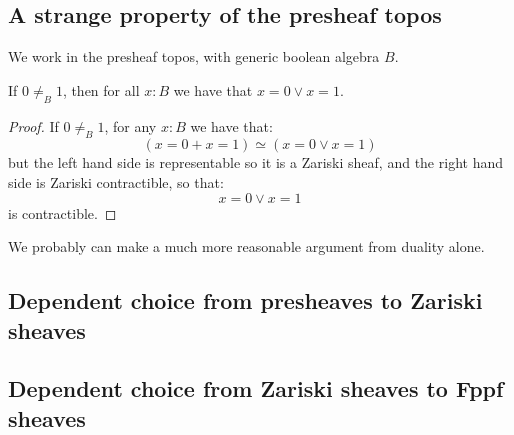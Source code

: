 \subsection{A strange property of the presheaf topos}

We work in the presheaf topos, with generic boolean algebra $B$.

\begin{lemma}
If $0\not=_B1$, then for all $x:B$ we have that $x=0\lor x=1$.
\end{lemma}

\begin{proof}
If $0\not=_B1$, for any $x:B$ we have that:
\[(x=0+x=1) \simeq (x=0\lor x=1)\]
but the left hand side is representable so it is a Zariski sheaf, and the right hand side is Zariski contractible, so that:
\[x=0\lor x=1\]
is contractible.
\end{proof}

\begin{remark}
We probably can make a much more reasonable argument from duality alone.
\end{remark}



\subsection{Dependent choice from presheaves to Zariski sheaves}


\subsection{Dependent choice from Zariski sheaves to Fppf sheaves}

